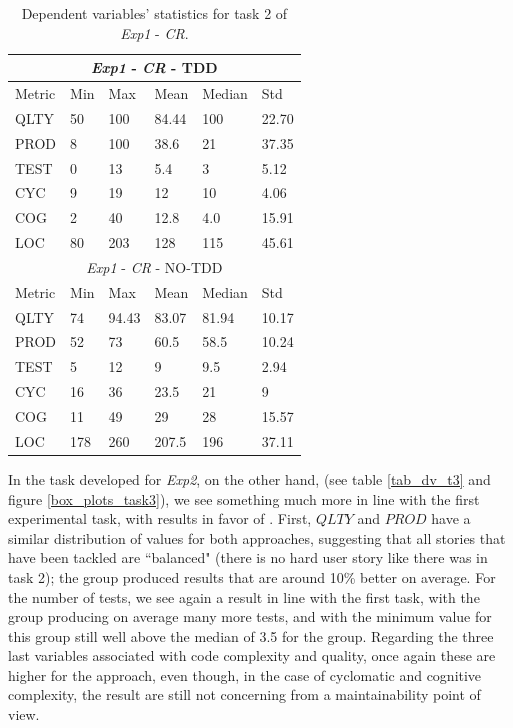 \begin{table}[H]
    \begin{center} 
        \begin{tabular}{ |p{2cm}||p{1.6cm}|p{1.6cm}|p{1.6cm}|p{1.6cm}|p{1.6cm}|}
            \hline
                \multicolumn{6}{|c|}{\textit{Exp1} - \textit{CR} - TDD} \\
            \hline
                Metric & Min & Max & Mean & Median & Std\\
            \hline
                QLTY & 50 & 100 & 84.44 & 100 & 22.70 \\
                PROD & 8 & 100 & 38.6 & 21 & 37.35 \\
                TEST & 0 & 13 & 5.4 & 3 & 5.12 \\
                CYC & 9 & 19 & 12 & 10 & 4.06 \\
                COG & 2 & 40 & 12.8 & 4.0 & 15.91 \\
                LOC & 80 & 203 & 128 & 115 & 45.61 \\
            \hline\hline
                \multicolumn{6}{|c|}{\textit{Exp1} - \textit{CR} - NO-TDD} \\
            \hline
                Metric & Min & Max & Mean & Median & Std\\
            \hline
                QLTY & 74 & 94.43 & 83.07 & 81.94 & 10.17 \\
                PROD & 52 & 73 & 60.5 & 58.5 & 10.24 \\
                TEST & 5 & 12 & 9 & 9.5 & 2.94 \\
                CYC & 16 & 36 & 23.5 & 21 & 9 \\
                COG & 11 & 49 & 29 & 28 & 15.57 \\
                LOC & 178 & 260 & 207.5 & 196 & 37.11 \\
            \hline
        \end{tabular}
        \caption{\label{tab_dv_t2}Dependent variables' statistics for task 2 of \textit{Exp1} - \textit{CR}.}
    \end{center}
\end{table}

In the task developed for \textit{Exp2}, on the other hand, (see table \ref{tab_dv_t3} and figure \ref{box_plots_task3}), we see something much more in line with the first experimental task, with results in favor of \tdd.
First, $QLTY$ and $PROD$ have a similar distribution of values for both approaches, suggesting that all stories that have been tackled are ``balanced" (\ie there is no hard user story like there was in task 2); the \tdd group produced results that are around 10\% better on average.
For the number of tests, we see again a result in line with the first task, with the \tdd group producing on average many more tests, and with the minimum value for this group still well above the median of 3.5 for the \notdd group.
Regarding the three last variables associated with code complexity and quality, once again these are higher for the \tdd approach, even though, in the case of cyclomatic and cognitive complexity, the result are still not concerning from a maintainability point of view.

